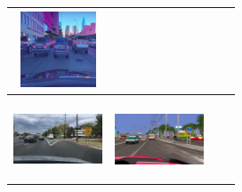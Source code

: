 \documentclass{VUMIFPSbakalaurinis}
\begin{document}
\begin{table}[H]
{\begin{tabular}{|c|c|c|c|}
            \includegraphics[width=100,height=85]{img/diffusion/instruct/7c0a7d5a-da928c23} \\
            \hline
            \\
            \includegraphics[width=100,height=85]{img/original/7c9cf422-f19cd065} & 
            \includegraphics[width=100,height=85]{img/diffusion/controlnet/7c9cf422-f19cd065} & 

\end{tabular}}
\end{table}
\end{document}
